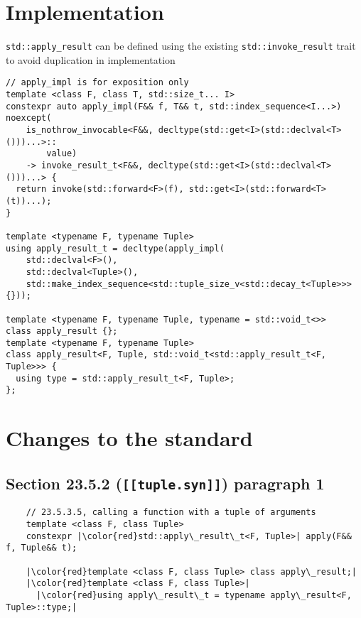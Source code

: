 \documentclass{article}
\begin{document}
\section{Implementation}
\texttt{std::apply\_result} can be defined using the existing
\texttt{std::invoke\_result} trait to avoid duplication in implementation

\begin{lstlisting}
// apply_impl is for exposition only
template <class F, class T, std::size_t... I>
constexpr auto apply_impl(F&& f, T&& t, std::index_sequence<I...>) noexcept(
    is_nothrow_invocable<F&&, decltype(std::get<I>(std::declval<T>()))...>::
        value)
    -> invoke_result_t<F&&, decltype(std::get<I>(std::declval<T>()))...> {
  return invoke(std::forward<F>(f), std::get<I>(std::forward<T>(t))...);
}

template <typename F, typename Tuple>
using apply_result_t = decltype(apply_impl(
    std::declval<F>(),
    std::declval<Tuple>(),
    std::make_index_sequence<std::tuple_size_v<std::decay_t<Tuple>>>{}));

template <typename F, typename Tuple, typename = std::void_t<>>
class apply_result {};
template <typename F, typename Tuple>
class apply_result<F, Tuple, std::void_t<std::apply_result_t<F, Tuple>>> {
  using type = std::apply_result_t<F, Tuple>;
};
\end{lstlisting}

\section{Changes to the standard}
\subsection{Section 23.5.2 (\texttt{[[tuple.syn]]}) paragraph 1}
\begin{lstlisting}
    // 23.5.3.5, calling a function with a tuple of arguments
    template <class F, class Tuple>
    constexpr |\color{red}std::apply\_result\_t<F, Tuple>| apply(F&& f, Tuple&& t);

    |\color{red}template <class F, class Tuple> class apply\_result;|
    |\color{red}template <class F, class Tuple>|
      |\color{red}using apply\_result\_t = typename apply\_result<F, Tuple>::type;|
\end{lstlisting}
\end{document}
